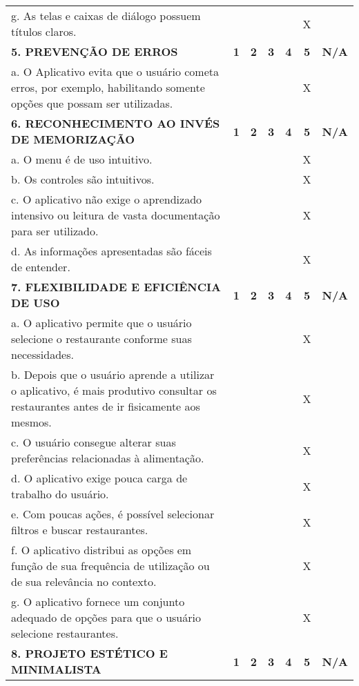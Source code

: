 \documentclass[portuguese,oneside]{tcc}
\begin{document}
\begin{center}
\begin{longtabu}{|L{25em}|c|c|c|c|c|c|}
								g. As telas e caixas de diálogo possuem títulos claros. & & & & & X & \\ 
								\textbf{5. PREVENÇÃO DE ERROS} & \textbf{1} & \textbf{2} & \textbf{3} & \textbf{4} & \textbf{5} & \textbf{N/A} \\ 
								a. O Aplicativo evita que o usuário cometa erros, por exemplo, habilitando somente opções que possam ser utilizadas. & & & & & X & \\ 
								\textbf{6. RECONHECIMENTO AO INVÉS DE MEMORIZAÇÃO} & \textbf{1} & \textbf{2} & \textbf{3} & \textbf{4} & \textbf{5} & \textbf{N/A} \\ 
								a. O  menu é de uso intuitivo. & & & & & X & \\ 
								b. Os controles são intuitivos. & & & & & X & \\ 
								c. O aplicativo não exige o aprendizado intensivo ou leitura de vasta documentação para ser utilizado. & & & & & X & \\ 
								d. As informações apresentadas são fáceis de entender. & & & & & X & \\ 
								\textbf{7. FLEXIBILIDADE E EFICIÊNCIA DE USO} & \textbf{1} & \textbf{2} & \textbf{3} & \textbf{4} & \textbf{5} & \textbf{N/A} \\ 
								a. O aplicativo permite que o usuário selecione o restaurante conforme suas necessidades. & & & & & X & \\ 
								b. Depois que o usuário aprende a utilizar o aplicativo, é mais produtivo consultar os restaurantes antes de ir fisicamente aos mesmos. & & & & & X & \\ 
								c. O usuário consegue alterar suas preferências relacionadas à alimentação. & & & & & X & \\ 
								d. O aplicativo exige pouca carga de trabalho do usuário. & & & & & X & \\ 
								e. Com poucas ações, é possível selecionar filtros e buscar restaurantes. & & & & & X & \\ 
								f. O aplicativo distribui as opções em função de sua frequência de utilização ou de sua relevância no contexto.	& & & & & X & \\ 
								g. O aplicativo fornece um conjunto adequado de opções para que o usuário selecione restaurantes. & & & & & X & \\ 
								\textbf{8. PROJETO ESTÉTICO E MINIMALISTA} & \textbf{1} & \textbf{2} & \textbf{3} & \textbf{4} & \textbf{5} & \textbf{N/A} \\ 

\end{longtabu}
\end{center}
\end{document}
